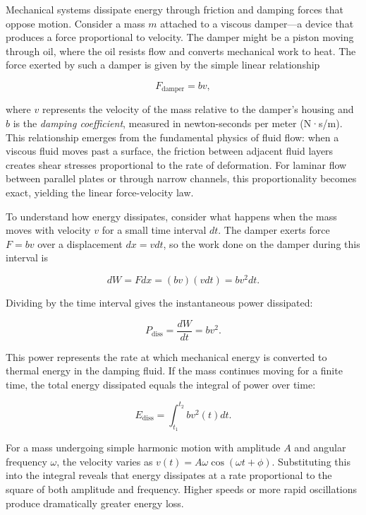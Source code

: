 Mechanical systems dissipate energy through friction and damping forces that oppose motion. Consider a mass $m$ attached to a viscous damper—a device that produces a force proportional to velocity. The damper might be a piston moving through oil, where the oil resists flow and converts mechanical work to heat. The force exerted by such a damper is given by the simple linear relationship

$$F_{\text{damper}} = b v,$$

where $v$ represents the velocity of the mass relative to the damper's housing and $b$ is the \emph{damping coefficient}, measured in newton-seconds per meter (N·s/m). This relationship emerges from the fundamental physics of fluid flow: when a viscous fluid moves past a surface, the friction between adjacent fluid layers creates shear stresses proportional to the rate of deformation. For laminar flow between parallel plates or through narrow channels, this proportionality becomes exact, yielding the linear force-velocity law.

To understand how energy dissipates, consider what happens when the mass moves with velocity $v$ for a small time interval $dt$. The damper exerts force $F = b v$ over a displacement $dx = v  dt$, so the work done on the damper during this interval is

$$dW = F  dx = (b v)(v  dt) = b v^2  dt.$$

Dividing by the time interval gives the instantaneous power dissipated:

$$P_{\text{diss}} = \frac{dW}{dt} = b v^2.$$

This power represents the rate at which mechanical energy is converted to thermal energy in the damping fluid. If the mass continues moving for a finite time, the total energy dissipated equals the integral of power over time:

$$E_{\text{diss}} = \int_{t_1}^{t_2} b v^2(t)  dt.$$

For a mass undergoing simple harmonic motion with amplitude $A$ and angular frequency $\omega$, the velocity varies as $v(t) = A\omega \cos(\omega t + \phi)$. Substituting this into the integral reveals that energy dissipates at a rate proportional to the square of both amplitude and frequency. Higher speeds or more rapid oscillations produce dramatically greater energy loss.

